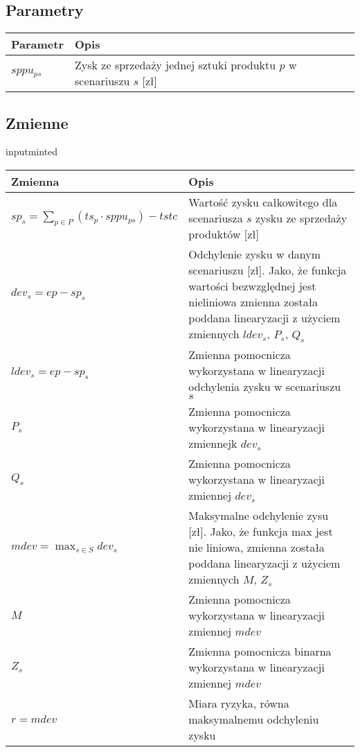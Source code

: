 \documentclass{article}
\begin{document}
\subsection{Parametry}

\begin{table}[H]
\centering
\begin{tabular}{|l|l|}
\hline
Parametr & Opis \\
\hline
$sppu_{ps}$ & Zysk ze sprzedaży jednej sztuki produktu $p$ w scenariuszu $s$ [zł] \\
\hline
\end{tabular}
\end{table}

\subsection{Zmienne}
inputminted
\begin{table}[H]
\centering
\begin{tabular}{|l|p{10cm}|}
\hline
Zmienna & Opis \\
\hline
$sp_s = \sum_{p \in P} (ts_p \cdot sppu_{ps}) - tstc$ & Wartość zysku całkowitego dla scenariusza $s$ zysku ze sprzedaży produktów [zł] \\
\hline
$dev_s = ep - sp_s$ & Odchylenie zysku w danym scenariuszu [zł]. Jako, że funkcja wartości bezwzględnej jest nieliniowa zmienna została poddana linearyzacji z użyciem zmiennych $ldev_s$, $P_s$, $Q_s$ \\
\hline
$ldev_s = ep - sp_s$ & Zmienna pomocnicza wykorzystana w linearyzacji odchylenia zysku w scenariuszu $s$ \\
\hline
$P_s$ & Zmienna pomocnicza wykorzystana w linearyzacji zmiennejk $dev_s$ \\
\hline
$Q_s$ & Zmienna pomocnicza wykorzystana w linearyzacji zmiennej $dev_s$ \\
\hline
$mdev = \max_{s \in S} dev_s$ & Maksymalne odchylenie zysu [zł]. Jako, że funkcja max jest nie liniowa, zmienna została poddana linearyzacji z użyciem zmiennych $M$, $Z_s$ \\
\hline
$M$ & Zmienna pomocnicza wykorzystana w linearyzacji zmiennej $mdev$ \\
\hline
$Z_s$ & Zmienna pomocnicza binarna wykorzystana w linearyzacji zmiennej $mdev$ \\
\hline
$r = mdev$ & Miara ryzyka, równa maksymalnemu odchyleniu zysku \\
\hline
\end{tabular}
\end{table}
\end{document}

